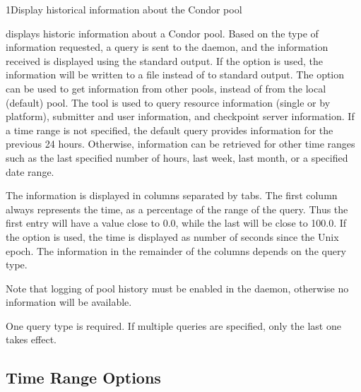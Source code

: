 \begin{ManPage}{}{1}{Display historical information about the Condor pool}
\label{man-condor-stats}
\Synopsis {}


\Description
{} displays historic information about a Condor pool.
Based on the type of information requested,
a query is sent to the  daemon,
and the information received is displayed using the standard output.
If the  option is used,
the information will be written to a file instead of
to standard output.
The  option can be used to get information from 
other pools, instead of from the local (default) pool.
The  tool is used to query resource 
information (single or by platform),
submitter and user information,
and checkpoint server information.
If a time range is not specified,
the default query provides information for the previous 24 hours.
Otherwise, information can be retrieved for other time ranges such as the last
specified number of hours, last week, last month, or a specified date range.

The information is displayed in columns separated by tabs.
The first column always represents the time,
as a percentage of the range of the query.
Thus the first entry will have a value close to 0.0,
while the last will be close to 100.0.
If the  option is used,
the time is displayed as number of seconds
since the Unix epoch.
The information in the remainder of the columns depends on the query type.

Note that logging of pool history must be enabled in the 
daemon, otherwise
no information will be available.

One query type is required.
If multiple queries are specified, only the last one takes effect.

\subsection*{Time Range Options}
\par
\begin{description}
\end{description}
\par


\end{ManPage}
